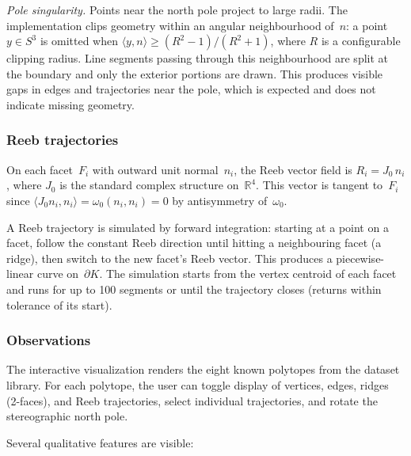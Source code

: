 \emph{Pole singularity.}
Points near the north pole project to large radii.
The implementation clips geometry within an angular neighbourhood
of~$n$: a point~$y \in S^3$ is omitted when
$\langle y, n \rangle \geq (R^2 - 1)/(R^2 + 1)$,
where $R$ is a configurable clipping radius.
Line segments passing through this neighbourhood are split at the
boundary and only the exterior portions are drawn.
This produces visible gaps in edges and trajectories near the pole,
which is expected and does not indicate missing geometry.

\subsubsection*{Reeb trajectories}

On each facet~$F_i$ with outward unit normal~$n_i$,
the Reeb vector field is $R_i = J_0 \, n_i$,
where $J_0$ is the standard complex structure on~$\mathbb{R}^4$.
This vector is tangent to~$F_i$ since
$\langle J_0 n_i, n_i \rangle = \omega_0(n_i, n_i) = 0$
by antisymmetry of~$\omega_0$.

A Reeb trajectory is simulated by forward integration:
starting at a point on a facet, follow the constant Reeb direction
until hitting a neighbouring facet (a ridge), then switch to the
new facet's Reeb vector.
This produces a piecewise-linear curve on~$\partial K$.
The simulation starts from the vertex centroid of each facet and
runs for up to 100 segments or until the trajectory closes
(returns within tolerance of its start).

\subsubsection*{Observations}

The interactive visualization renders the eight known polytopes
from the dataset library.
For each polytope, the user can toggle display of vertices, edges,
ridges (2-faces), and Reeb trajectories, select individual
trajectories, and rotate the stereographic north pole.

Several qualitative features are visible:

